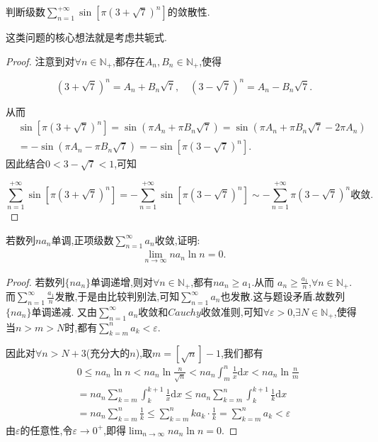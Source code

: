 \documentclass[lang=cn,newtx,10pt,scheme=chinese]{../Template/elegantbook}
\begin{document}
\begin{example}
判断级数$\sum_{n=1}^{+\infty}{\sin \left[ \pi \left( 3+\sqrt{7} \right) ^n \right]}$的敛散性.
\end{example}
\begin{note}
这类问题的核心想法就是考虑共轭式.
\end{note}
\begin{proof}
注意到对\(\forall n \in \mathbb{N}_+\),都存在\(A_n,B_n \in \mathbb{N}_+\),使得

\[
(3 + \sqrt{7})^n = A_n + B_n\sqrt{7}, \quad (3 - \sqrt{7})^n = A_n - B_n\sqrt{7}.
\]

从而
\begin{align*}
&\sin[\pi(3 + \sqrt{7})^n] = \sin(\pi A_n + \pi B_n\sqrt{7})
= \sin(\pi A_n + \pi B_n\sqrt{7} - 2\pi A_n)\\
&= -\sin(\pi A_n - \pi B_n\sqrt{7})= -\sin[\pi(3 - \sqrt{7})^n].
\end{align*}
因此结合\(0 < 3 - \sqrt{7} < 1\),可知

\[
\sum_{n = 1}^{+\infty} \sin[\pi(3 + \sqrt{7})^n] = -\sum_{n = 1}^{+\infty} \sin[\pi(3 - \sqrt{7})^n] \sim -\sum_{n = 1}^{+\infty} \pi(3 - \sqrt{7})^n \text{收敛}.
\]
\end{proof}

\begin{example}
若数列${na_n}$单调,正项级数$\sum_{n=1}^{\infty}{a_n}$收敛,证明:
\begin{align*}
\lim_{n\rightarrow \infty} na_n\ln n=0.
\end{align*}
\end{example}
\begin{proof}
若数列\(\{ na_n\}\)单调递增,则对\(\forall n \in \mathbb{N}_+\),都有\(na_n \geqslant a_1\).从而
\(a_n \geqslant \frac{a_1}{n}\),\(\forall n \in \mathbb{N}_+\).
而\(\sum_{n = 1}^{\infty}\frac{a_1}{n}\)发散,于是由比较判别法,可知\(\sum_{n = 1}^{\infty}a_n\)也发散.这与题设矛盾.故数列\(\{ na_n\}\)单调递减.
又由\(\sum_{n = 1}^{\infty}a_n\)收敛和\(Cauchy\)收敛准则,可知\(\forall \varepsilon > 0\),\(\exists N \in \mathbb{N}_+\),使得当\(n > m > N\)时,都有\(\sum_{k = m}^{n}a_k < \varepsilon\).

因此对\(\forall n > N + 3\)(充分大的\(n\)),取\(m = [\sqrt{n}] - 1\),我们都有
\begin{align*}
&0 \leqslant na_n\ln n < na_n\ln\frac{n}{\sqrt{n}} < na_n\int_{m}^{n}\frac{1}{x}\mathrm{d}x<na_n\ln \frac{n}{m} \\
&= na_n\sum_{k = m}^{n}\int_{k}^{k + 1}\frac{1}{x}\mathrm{d}x \leqslant na_n\sum_{k = m}^{n}\int_{k}^{k + 1}\frac{1}{k}\mathrm{d}x\\
&= na_n\sum_{k = m}^{n}\frac{1}{k} \leqslant \sum_{k = m}^{n}ka_k\cdot\frac{1}{k} = \sum_{k = m}^{n}a_k < \varepsilon
\end{align*}
由\(\varepsilon\)的任意性,令\(\varepsilon \to 0^+\),即得\(\lim_{n \to \infty}na_n\ln n = 0\). 
\end{proof}
\end{document}
